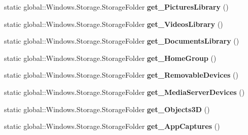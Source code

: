 \begin{DoxyCompactItemize}
\mbox{\label{class_windows_1_1_storage_1_1_known_folders_a653b9b1f039c720de8b02e32d4139930}} 
static global\+::\+Windows.\+Storage.\+Storage\+Folder {\bfseries get\+\_\+\+Pictures\+Library} ()
\item 
\mbox{\label{class_windows_1_1_storage_1_1_known_folders_a4e637cb715e9d1600f05e297b1f73be7}} 
static global\+::\+Windows.\+Storage.\+Storage\+Folder {\bfseries get\+\_\+\+Videos\+Library} ()
\item 
\mbox{\label{class_windows_1_1_storage_1_1_known_folders_a46d0afa10b55b07fcbe5b69b12c6a351}} 
static global\+::\+Windows.\+Storage.\+Storage\+Folder {\bfseries get\+\_\+\+Documents\+Library} ()
\item 
\mbox{\label{class_windows_1_1_storage_1_1_known_folders_afaf43060342706d67a7a25a467545948}} 
static global\+::\+Windows.\+Storage.\+Storage\+Folder {\bfseries get\+\_\+\+Home\+Group} ()
\item 
\mbox{\label{class_windows_1_1_storage_1_1_known_folders_a7d4f37e230205c7d410066952eeac000}} 
static global\+::\+Windows.\+Storage.\+Storage\+Folder {\bfseries get\+\_\+\+Removable\+Devices} ()
\item 
\mbox{\label{class_windows_1_1_storage_1_1_known_folders_afd2c3f741c42f2f472afa0f33c0a19c6}} 
static global\+::\+Windows.\+Storage.\+Storage\+Folder {\bfseries get\+\_\+\+Media\+Server\+Devices} ()
\item 
\mbox{\label{class_windows_1_1_storage_1_1_known_folders_a7538b526a7c946e575ca80ffce8b9c64}} 
static global\+::\+Windows.\+Storage.\+Storage\+Folder {\bfseries get\+\_\+\+Objects3D} ()
\item 
\mbox{\label{class_windows_1_1_storage_1_1_known_folders_ab66696615f1c71c5ee62274cc6643a89}} 
static global\+::\+Windows.\+Storage.\+Storage\+Folder {\bfseries get\+\_\+\+App\+Captures} ()
\item 

\end{DoxyCompactItemize}
